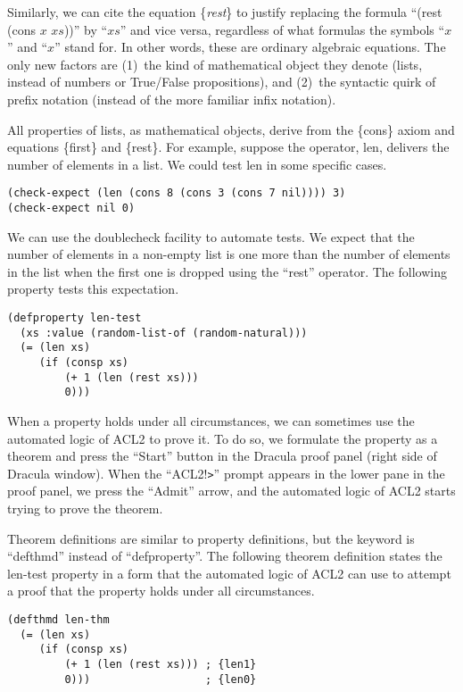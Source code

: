 Similarly, we can cite the equation \{\emph{rest}\} to justify replacing the formula ``(rest (cons $x$ $xs$))'' by ``$xs$'' and vice versa, regardless of what formulas the symbols ``$x$'' and ``$x$'' stand for. In other words, these are ordinary algebraic equations. The only new factors are
(1)~the kind of mathematical object they denote (lists, instead of numbers or True/False propositions), and
(2)~the syntactic quirk of prefix notation (instead of the more familiar infix notation).

All properties of lists, as mathematical objects, derive from the \{cons\} axiom and equations \{first\} and \{rest\}. For example, suppose the operator, len, delivers the number of elements in a list. We could test len in some specific cases.

\begin{lstlisting}
(check-expect (len (cons 8 (cons 3 (cons 7 nil)))) 3)
(check-expect nil 0)
\end{lstlisting}

We can use the doublecheck facility to automate tests. We expect that the number of elements in a non-empty list is one more than the number of elements in the list when the first one is dropped using the ``rest'' operator. The following property tests this expectation.

\begin{lstlisting}
(defproperty len-test
  (xs :value (random-list-of (random-natural)))
  (= (len xs)
     (if (consp xs)
         (+ 1 (len (rest xs)))
         0)))
\end{lstlisting}

When a property holds under all circumstances, we can sometimes use the automated logic of ACL2 to prove it. To do so, we formulate the property as a theorem and press the ``Start'' button in the Dracula proof panel (right side of Dracula window). When the ``ACL2!\verb+>+'' prompt appears in the lower pane in the proof panel, we press the ``Admit'' arrow, and the automated logic of ACL2 starts trying to prove the theorem.

Theorem definitions are similar to property definitions, but the keyword is ``defthmd'' instead of ``defproperty''. The following theorem definition states the len-test property in a form that the automated logic of ACL2 can use to attempt a proof that the property holds under all circumstances.

\label{len-thm}
\begin{lstlisting}
(defthmd len-thm
  (= (len xs)
     (if (consp xs)
         (+ 1 (len (rest xs))) ; {len1}
         0)))                  ; {len0}
\end{lstlisting}

